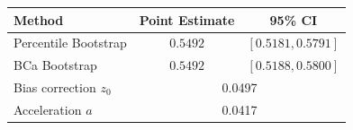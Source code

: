 \begin{tabular}{lcc} \toprule Method & Point Estimate & 95\% CI \\ \midrule Percentile Bootstrap & $0.5492$ & $[0.5181, 0.5791]$ \\ BCa Bootstrap & $0.5492$ & $[0.5188, 0.5800]$ \\  Bias correction $z_0$ & \multicolumn{2}{c}{0.0497} \\  Acceleration $a$ & \multicolumn{2}{c}{0.0417} \\ \bottomrule \end{tabular}